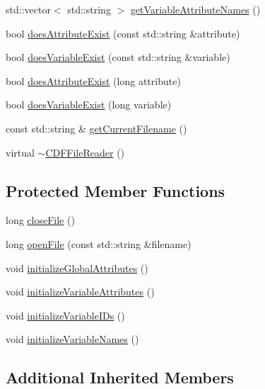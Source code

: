 \begin{DoxyCompactItemize}
std\-::vector$<$ std\-::string $>$ \hyperlink{classccmc_1_1_c_d_f_file_reader_a52a904328cc0cb1ca7625c9469ca11ca}{get\-Variable\-Attribute\-Names} ()
\item 
bool \hyperlink{classccmc_1_1_c_d_f_file_reader_a2a13faebed9123459d75413e1388d6fa}{does\-Attribute\-Exist} (const std\-::string \&attribute)
\item 
bool \hyperlink{classccmc_1_1_c_d_f_file_reader_a6211014aebd161eb08dcddf7d249743a}{does\-Variable\-Exist} (const std\-::string \&variable)
\item 
bool \hyperlink{classccmc_1_1_c_d_f_file_reader_a6360eae4aeec86d95b750711fbfefcb6}{does\-Attribute\-Exist} (long attribute)
\item 
bool \hyperlink{classccmc_1_1_c_d_f_file_reader_a23a40091a6f58aaee5788d449dd87aa4}{does\-Variable\-Exist} (long variable)
\item 
const std\-::string \& \hyperlink{classccmc_1_1_c_d_f_file_reader_ab8274e8003b7700b2b860aef29a2cd6f}{get\-Current\-Filename} ()
\item 
virtual \hyperlink{classccmc_1_1_c_d_f_file_reader_a71fd30b3d6509401ea788aab46a1a142}{$\sim$\-C\-D\-F\-File\-Reader} ()
\end{DoxyCompactItemize}
\subsection*{Protected Member Functions}
\begin{DoxyCompactItemize}
\item 
long \hyperlink{classccmc_1_1_c_d_f_file_reader_a3eedaa5cdd71af7b4bf668ff3c9928ce}{close\-File} ()
\item 
long \hyperlink{classccmc_1_1_c_d_f_file_reader_a98d1d6bbd26aab8d1e285fa34179dfa8}{open\-File} (const std\-::string \&filename)
\item 
void \hyperlink{classccmc_1_1_c_d_f_file_reader_ae79ea609f0de436d1f78809668d1b84e}{initialize\-Global\-Attributes} ()
\item 
void \hyperlink{classccmc_1_1_c_d_f_file_reader_adf5fe4154607e05e6d5e8652f26c0d86}{initialize\-Variable\-Attributes} ()
\item 
void \hyperlink{classccmc_1_1_c_d_f_file_reader_a20efd34232f8348d44291b589a94d56a}{initialize\-Variable\-I\-Ds} ()
\item 
void \hyperlink{classccmc_1_1_c_d_f_file_reader_ab9c343c409df6b079c270e9598ac0fd0}{initialize\-Variable\-Names} ()
\end{DoxyCompactItemize}
\subsection*{Additional Inherited Members}


